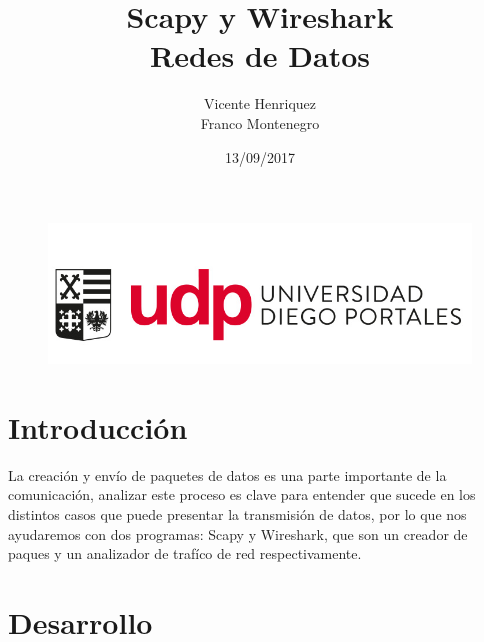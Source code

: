 \documentclass{article}
\begin{document}
\begin{figure}[t!]
\includegraphics[scale=0.3]{logo_udp.PNG}
\label{fig:udplogo}
\end{figure}

\title{\textbf{{Scapy y Wireshark \\ Redes de Datos \vspace{10cm}}}}
\author{\hspace{8cm} Vicente Henriquez \\ \hspace{8cm} Franco Montenegro}
\date{\hspace{8cm} 13/09/2017}
\maketitle

\newpage
\tableofcontents
\newpage
\section{Introducción \vspace{0.5cm}}
La creación y envío de paquetes de datos es una parte importante de la comunicación, analizar este proceso es clave para entender que sucede en los distintos casos que puede presentar la transmisión de datos, por lo que nos ayudaremos con dos programas: Scapy y Wireshark, que son un creador de paques y un analizador de trafíco de red respectivamente.

\newpage
\section{Desarrollo \vspace{0.5cm}}
\end{document}
